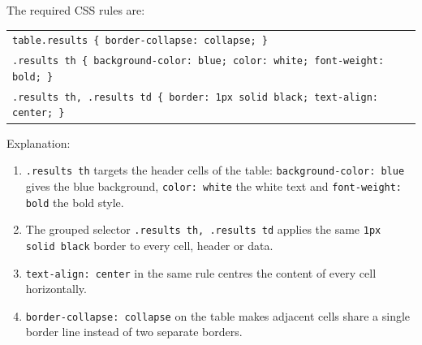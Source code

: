 \documentclass[11pt]{article}
\begin{document}
\begin{corrige}
The required CSS rules are:
\begin{center}
\begin{tabular}{l}
\texttt{table.results \{ border-collapse: collapse; \}}\\
\texttt{.results th \{ background-color: blue; color: white; font-weight: bold; \}}\\
\texttt{.results th, .results td \{ border: 1px solid black; text-align: center; \}}\\
\end{tabular}
\end{center}
Explanation:
\begin{enumerate}
\item \texttt{.results th} targets the header cells of the table: \texttt{background-color: blue} gives the blue background, \texttt{color: white} the white text and \texttt{font-weight: bold} the bold style.
\item The grouped selector \texttt{.results th, .results td} applies the same \texttt{1px solid black} border to every cell, header or data.
\item \texttt{text-align: center} in the same rule centres the content of every cell horizontally.
\item \texttt{border-collapse: collapse} on the table makes adjacent cells share a single border line instead of two separate borders.
\end{enumerate}
\end{corrige}
\end{document}
